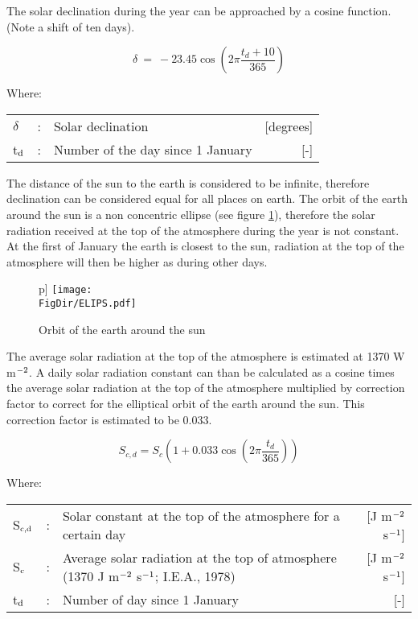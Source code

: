 The solar declination during the year can be approached by a cosine function. (Note a shift of ten days).

\begin{equation}
\delta ~=~ -23.45 \cos ( 2 \pi {\frac{t _{d} + 10}{365}} )
\end{equation}

Where:\\[5pt]
\begin{tabularx}{\textwidth}{llXr}
$\delta$ &:& Solar declination   & [de\-grees]\\
t$_{{\rm d}}$ &:& Number of the day since 1 January   & [-]\\
\end{tabularx}

The distance of the sun to the earth is considered to be infinite, therefore declination can be considered equal for all places on earth. The orbit of the earth around the sun is a non concentric ellipse (see figure \ref{fig:orbit}), therefore the solar radiation received at the top of the atmosphere during the year is not constant. At the first of January the earth is closest to the sun, radiation at the top of the atmosphere will then be higher as during other days. \\

\begin{figure}p]
\centering
\texttt{[image: \\FigDir/ELIPS.pdf]}
\caption{Orbit of the earth around the sun}
\label{fig:orbit}
\end{figure}

The average solar radiation at the top of the atmosphere is estimated at 1370 W m$^{\rm -2}$. A daily solar radiation constant can than be calculated as a cosine times the average solar radiation at the top of the atmosphere multiplied by correction factor to correct for the elliptical orbit of the earth around the sun. This correction factor is estimated to be 0.033.

\begin{equation}
\label{eq:SolarConst}
S _{c,d} = S _{c} (1+0.033 \cos (2 \pi {\frac{t _{d} }{365}} ))
\end{equation}

Where:\\[5pt]
\begin{tabularx}{\textwidth}{llXr}
S$_{{\rm c,d}}$ &:& Solar constant at the top of the atmosphere for a certain day  & [J m$^{{\rm -2}}$ s$^{{\rm -1}}$]\\
S$_{{\rm c}}$ &:& Average solar radiation at the top of atmosphere (1370 J m$^{{\rm -2}}$ s$^{{\rm -1}}$; I.E.A., 1978) & [J m$^{{\rm -2}}$ s$^{{\rm -1}}$]\\
t$_{{\rm d}}$ &:& Number of day since 1 January  & [-]\\
\end{tabularx}

